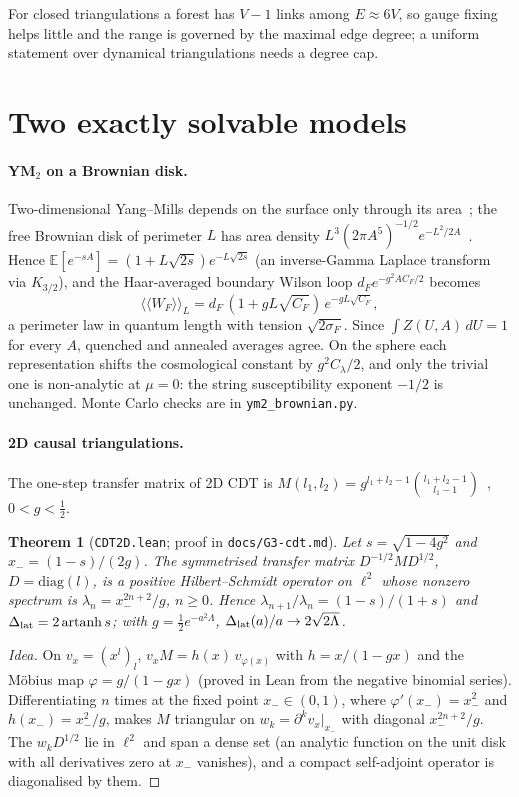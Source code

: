 \documentclass[aps,prd,twocolumn,superscriptaddress,nofootinbib]{revtex4-2}
\newtheorem{theorem}{Theorem}
\theoremstyle{remark}
\begin{document}
For closed triangulations a forest has $V-1$ links among $E\approx6V$, so gauge fixing helps little and the range is
governed by the maximal edge degree; a uniform statement over dynamical triangulations needs a degree cap.

\section{Two exactly solvable models}

\paragraph{YM$_2$ on a Brownian disk.} Two-dimensional Yang--Mills depends on the surface only through its
area~\cite{Sengupta,Levy}; the free Brownian disk of perimeter $L$ has area density
$L^3(2\pi A^5)^{-1/2}e^{-L^2/2A}$~\cite{BM}. Hence
$\mathbb E[e^{-sA}]=(1+L\sqrt{2s})e^{-L\sqrt{2s}}$ (an inverse-Gamma Laplace transform via $K_{3/2}$), and the
Haar-averaged boundary Wilson loop $d_Fe^{-g^2AC_F/2}$ becomes
\[
\langle\!\langle W_F\rangle\!\rangle_L=d_F\,(1+gL\sqrt{C_F})\,e^{-gL\sqrt{C_F}},
\]
a perimeter law in quantum length with tension $\sqrt{2\sigma_F}$. Since $\int Z(U,A)\,dU=1$ for every $A$,
quenched and annealed averages agree. On the sphere each representation shifts the cosmological constant by
$g^2C_\lambda/2$, and only the trivial one is non-analytic at $\mu=0$: the string susceptibility exponent $-1/2$ is
unchanged. Monte Carlo checks are in \texttt{ym2\_brownian.py}.

\paragraph{2D causal triangulations.} The one-step transfer matrix of 2D CDT is
$M(l_1,l_2)=g^{l_1+l_2-1}\binom{l_1+l_2-1}{l_1-1}$~\cite{AL}, $0<g<\tfrac12$.

\begin{theorem}[\texttt{CDT2D.lean}; proof in \texttt{docs/G3-cdt.md}]\label{thm:cdt}
Let $s=\sqrt{1-4g^2}$ and $x_-=(1-s)/(2g)$. The symmetrised transfer matrix $D^{-1/2}MD^{1/2}$, $D=\mathrm{diag}(l)$,
is a positive Hilbert--Schmidt operator on $\ell^2$ whose nonzero spectrum is $\lambda_n=x_-^{2n+2}/g$,
$n\ge0$. Hence $\lambda_{n+1}/\lambda_n=(1-s)/(1+s)$ and $\Delta_{\rm lat}=2\,\mathrm{artanh}\,s$; with
$g=\tfrac12e^{-a^2\Lambda}$, $\Delta_{\rm lat}(a)/a\to2\sqrt{2\Lambda}$.
\end{theorem}

\begin{proof}[Idea]
On $v_x=(x^l)_l$, $v_xM=h(x)\,v_{\varphi(x)}$ with $h=x/(1-gx)$ and the M\"obius map $\varphi=g/(1-gx)$ (proved in
Lean from the negative binomial series). Differentiating $n$ times at the fixed point $x_-\in(0,1)$, where
$\varphi'(x_-)=x_-^2$ and $h(x_-)=x_-^2/g$, makes $M$ triangular on $w_k=\partial^kv_x|_{x_-}$ with diagonal
$x_-^{2n+2}/g$. The $w_kD^{1/2}$ lie in $\ell^2$ and span a dense set (an analytic function on the unit disk with all
derivatives zero at $x_-$ vanishes), and a compact self-adjoint operator is diagonalised by them.
\end{proof}
\end{document}
